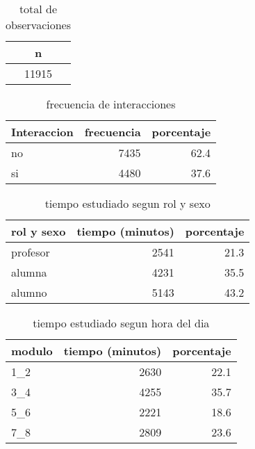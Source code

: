 \documentclass[spanish]{article}
\begin{document}
\begin{table}[h!]
\begin{center}
\begin{tabular}{|c|}
\hline
n    \\ \hline
11915\\ \hline
\end{tabular}
\caption{total de observaciones}
\end{center}
\end{table}

\begin{table}[h!]
\begin{center}
\begin{tabular}{|l|r|r|}
\hline
Interaccion & frecuencia & porcentaje   \\ \hline
no          &       7435 &          62.4\\ \hline
si          &       4480 &          37.6\\ \hline
\end{tabular}
\caption{frecuencia de interacciones}
\end{center}
\end{table}

\begin{table}[h!]
\begin{center}
\begin{tabular}{|l|r|r|}
\hline
rol y sexo & tiempo (minutos) & porcentaje   \\ \hline
profesor   &             2541 &          21.3\\ \hline
alumna     &             4231 &          35.5\\ \hline
alumno     &             5143 &          43.2\\ \hline
\end{tabular}
\caption{tiempo estudiado segun rol y sexo}
\end{center}
\end{table}

\begin{table}[h!]
\begin{center}
\begin{tabular}{|l|r|r|}
\hline
modulo & tiempo (minutos) & porcentaje   \\ \hline
1\_2    &             2630 &          22.1\\ \hline
3\_4    &             4255 &          35.7\\ \hline
5\_6    &             2221 &          18.6\\ \hline
7\_8    &             2809 &          23.6\\ \hline
\end{tabular}
\caption{tiempo estudiado segun hora del dia}
\end{center}
\end{table}
\end{document}
